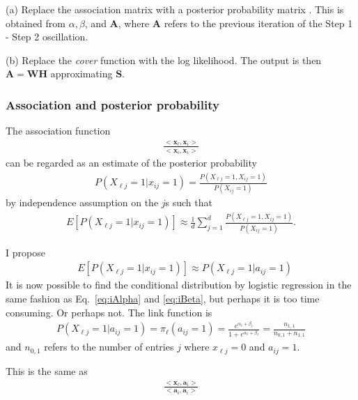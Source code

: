 \documentclass[12pt]{article}
\begin{document}
(a) Replace the association matrix with a posterior probability matrix \cite{Agrawal1993Mining}. This is obtained from $\alpha, \beta$, and $\mathbf{A}$, where $\mathbf{A}$ refers to the previous iteration of the Step 1 - Step 2 oscillation.

(b) Replace the {\it cover} function with the log likelihood. The output is then $\mathbf{A} = \mathbf{WH}$ approximating $\mathbf{S}$.

\subsubsection*{Association and posterior probability} %

The association function 
\begin{align}
 \frac{<\mathbf{x}_{\ell}, \mathbf{x}_i>}{<\mathbf{x}_{i},\mathbf{x}_{i}>}
\end{align}
can be regarded as an estimate of the posterior probability
\begin{align}
  P(X_{\ell j} = 1 | x_{i j} = 1) = \frac{P(X_{\ell j} = 1, X_{i j} = 1)}{P( X_{i j} = 1)}
\end{align}
by independence assumption on the $j$s such that 
\begin{align}
  E [ P(X_{\ell j} = 1 | x_{i j} = 1)] \approx  \frac{1}{d} \sum_{j = 1}^ d \frac{P(X_{\ell j} = 1, X_{i j} = 1)}{P( X_{i j} = 1)}.
\end{align}

I propose
\begin{align}
&   E [ P(X_{\ell j} = 1 | x_{i j} = 1)] \approx  P(X_{\ell j} = 1 | a_{i j} = 1)
\end{align}
It is now possible to find the conditional distribution by logistic regression in the same fashion as Eq.~\ref{eq:iAlpha} and \ref{eq:iBeta}, but perhaps it is too time consuming. 
Or perhaps not.
The link function is
\begin{align}
   P(X_{\ell j} = 1 | a_{i j} = 1) =  \pi_\ell(a_{ij}= 1) = \frac{e^{\alpha_{\ell} + \beta_{\ell}}}{1 + e^{\alpha_{\ell} + \beta_{\ell}}} = \frac{n_{1,1}}{n_{0,1} + n_{1,1}}
\end{align}
and $n_{0,1}$ refers to the number of entries $j$ where $x_{\ell j} = 0$ and $a_{ij} = 1$. 

This is the same as
\begin{align}
  \frac{<\mathbf{x}_{\ell},\mathbf{a}_i>}{<\mathbf{a}_{i},\mathbf{a}_{i}>}
\end{align}
\end{document}
